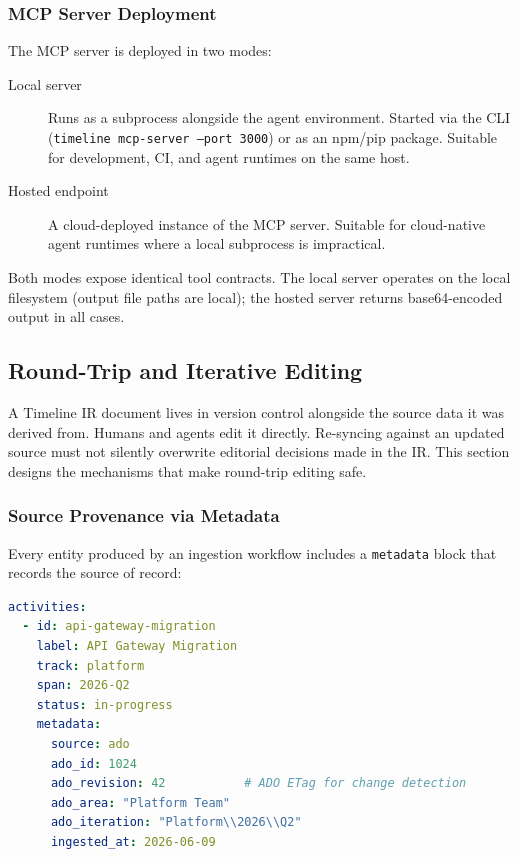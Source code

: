 \subsubsection{MCP Server Deployment}

The MCP server is deployed in two modes:

\begin{description}
  \item[Local server] Runs as a subprocess alongside the agent environment. Started
        via the CLI (\texttt{timeline mcp-server --port 3000}) or as an npm/pip
        package. Suitable for development, CI, and agent runtimes on the same host.
  \item[Hosted endpoint] A cloud-deployed instance of the MCP server. Suitable for
        cloud-native agent runtimes where a local subprocess is impractical.
\end{description}

Both modes expose identical tool contracts. The local server operates on the local
filesystem (output file paths are local); the hosted server returns base64-encoded
output in all cases.


\subsection{Round-Trip and Iterative Editing}
\label{sec:round-trip}

A Timeline IR document lives in version control alongside the source data it was derived
from. Humans and agents edit it directly. Re-syncing against an updated source must not
silently overwrite editorial decisions made in the IR. This section designs the mechanisms
that make round-trip editing safe.

\subsubsection{Source Provenance via Metadata}
\label{sec:provenance}

Every entity produced by an ingestion workflow includes a \texttt{metadata} block that
records the source of record:

\begin{lstlisting}[language=yaml,caption={Provenance metadata block (ADO example)}]
activities:
  - id: api-gateway-migration
    label: API Gateway Migration
    track: platform
    span: 2026-Q2
    status: in-progress
    metadata:
      source: ado
      ado_id: 1024
      ado_revision: 42           # ADO ETag for change detection
      ado_area: "Platform Team"
      ado_iteration: "Platform\\2026\\Q2"
      ingested_at: 2026-06-09
\end{lstlisting}

